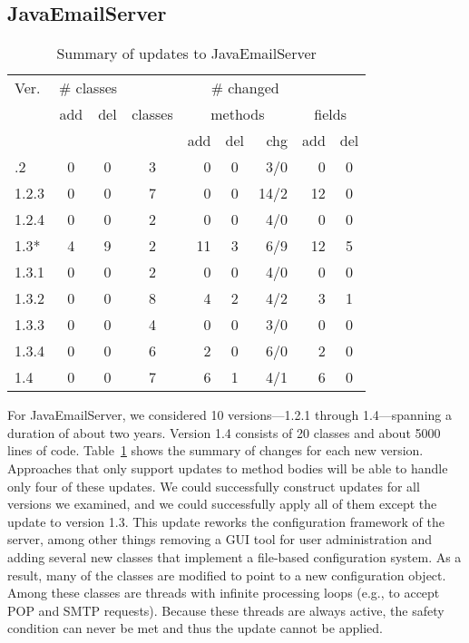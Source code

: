 \subsection{JavaEmailServer}
\label{subsec:jes}

\begin{table}[t]
\begin{footnotesize}
\begin{center}
\begin{tabular}{|l||c|c||c|r|c|r|r|c|} \hline \T
Ver.   & \multicolumn{2}{c||}{\# classes} &    \multicolumn{6}{c|}{\# changed} \\
       & add & del & classes & \multicolumn{3}{c|}{methods} & \multicolumn{2}{c|}{fields} \\
       &     &     &         & add & del & chg   & add & del \\ \hline \hline \T
1.2.2  & 0   & 0   & 3       & 0   & 0   & 3/0   & 0   & 0   \\
1.2.3  & 0   & 0   & 7       & 0   & 0   & 14/2  & 12  & 0   \\
1.2.4  & 0   & 0   & 2       & 0   & 0   & 4/0   & 0   & 0   \\
1.3*   & 4   & 9   & 2       & 11  & 3   & 6/9   & 12  & 5   \\
1.3.1  & 0   & 0   & 2       & 0   & 0   & 4/0   & 0   & 0   \\
1.3.2  & 0   & 0   & 8       & 4   & 2   & 4/2   & 3   & 1   \\
1.3.3  & 0   & 0   & 4       & 0   & 0   & 3/0   & 0   & 0   \\
1.3.4  & 0   & 0   & 6       & 2   & 0   & 6/0   & 2   & 0   \\
1.4    & 0   & 0   & 7       & 6   & 1   & 4/1   & 6   & 0   \\ \hline
\end{tabular}
\end{center}
\end{footnotesize}
\caption{Summary of updates to JavaEmailServer}
\label{tab:jes-changes}
\end{table}

For JavaEmailServer, we considered 10 versions---1.2.1 through
1.4---spanning a duration of about two years.   Version 1.4 
consists of 20 classes and about 5000 lines of code. 
Table~\ref{tab:jes-changes} shows the summary of changes for each new
version. Approaches that only support updates to method bodies will be able
to handle only four of these updates. We
could successfully construct updates for all versions we examined, and
we could successfully apply all of them except the update to version 1.3.
This update reworks the configuration framework of the server, among other
things removing a GUI tool for user administration and adding several
new classes that implement a file-based configuration system.  As a result, many of
the classes are modified to point to a new configuration object.
Among these classes are threads with infinite processing loops (e.g., to accept
POP and SMTP requests). Because these threads are always active, the
safety condition can never be met and thus the update cannot be
applied.

